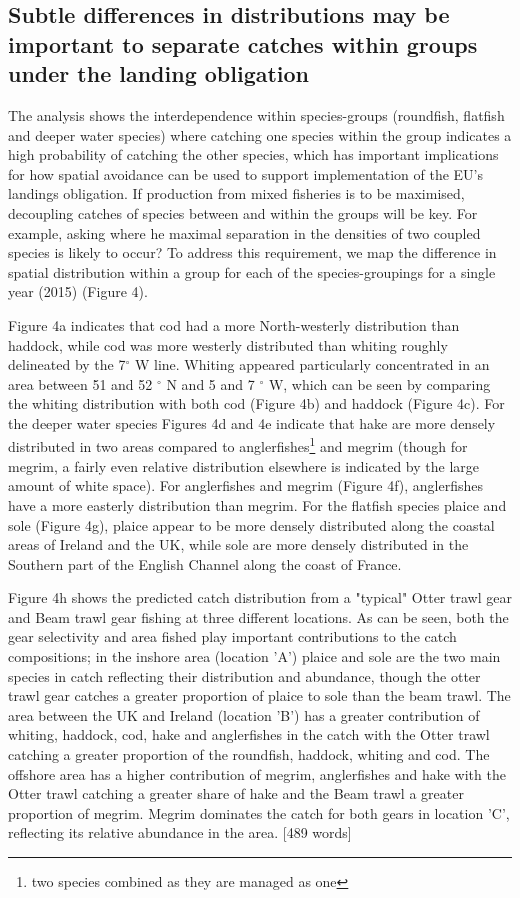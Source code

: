 \documentclass{nature}
\begin{document}
\begin{linenumbers}
\subsection{Subtle differences in distributions may be important to separate
	catches within groups under the landing obligation} The analysis shows
the interdependence within species-groups (roundfish, flatfish and deeper water
species) where catching one species within the group indicates a high
probability of catching the other species, which has important implications for
how spatial avoidance can be used to support implementation of the EU's
landings obligation. If production from mixed fisheries is to be maximised,
decoupling catches of species between and within the groups will be key. For
example, asking where he maximal separation in the densities of two coupled
species is likely to occur? To address this requirement, we map the difference
in spatial distribution within a group for each of the species-groupings for a
single year (2015) (Figure 4). 

Figure 4a indicates that cod had a more North-westerly distribution than
haddock, while cod was more westerly distributed than whiting roughly
delineated by the 7$^{\circ}$ W line. Whiting appeared particularly
concentrated in an area between 51 and 52 $^{\circ}$ N and 5 and 7 $^{\circ}$
W, which can be seen by comparing the whiting distribution with both cod
(Figure 4b) and haddock (Figure 4c). For the deeper water species Figures 4d
and 4e indicate that hake are more densely distributed in two areas compared to
anglerfishes\footnote{two species combined as they are managed as one} and
megrim (though for megrim, a fairly even relative distribution elsewhere is
indicated by the large amount of white space). For anglerfishes and megrim
(Figure 4f), anglerfishes have a more easterly distribution than megrim. For
the flatfish species plaice and sole (Figure 4g), plaice appear to be more
densely distributed along the coastal areas of Ireland and the UK, while sole
are more densely distributed in the Southern part of the English Channel along
the coast of France.

Figure 4h shows the predicted catch distribution from a "typical" Otter trawl
gear and Beam trawl gear fishing at three different locations. As can be seen,
both the gear selectivity and area fished play important contributions to the
catch compositions; in the inshore area (location 'A') plaice and sole are the
two main species in catch reflecting their distribution and abundance, though
the otter trawl gear catches a greater proportion of plaice to sole than the
beam trawl.  The area between the UK and Ireland (location 'B') has a greater
contribution of whiting, haddock, cod, hake and anglerfishes in the catch with
the Otter trawl catching a greater proportion of the roundfish, haddock,
whiting and cod. The offshore area has a higher contribution of megrim,
anglerfishes and hake with the Otter trawl catching a greater share of hake and
the Beam trawl a greater proportion of megrim. Megrim dominates the catch for
both gears in location 'C', reflecting its relative abundance in the area.
[489 words]


\end{linenumbers}
\end{document}
